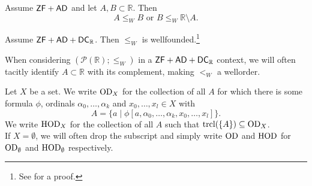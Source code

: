 \documentclass[../main]{subfiles}
\begin{document}
\begin{lemma}
  Assume $\textsf{ZF} + \textsf{AD}$ and let $A, B \subset \mathbb{R}$. Then
  \[
    A \le_{W} B \text{ or } B \le_{W} \mathbb{R} \setminus A.
  \]  
\end{lemma}

\begin{lemma}
  Assume $\textsf{ZF} + \textsf{AD} + \textsf{DC}_{\mathbb{R}}$. Then
  $\leq_{W}$ is wellfounded.\footnote{See \cite{Larson} for a proof.}
\end{lemma}

\begin{remark}
  When considering $(\mathcal{P}(\mathbb{R}); \le_{W})$ in a
  $\textsf{ZF} + \textsf{AD}+\textsf{DC}_{\mathbb R}$ context, we will often tacitly identify
  $A \subset \mathbb{R}$ with its complement, making $<_W$ a wellorder.
\end{remark}


\begin{definition}
  Let $X$ be a set. We write $\operatorname{OD}_{X}$  for the
  collection of all $A$ for which there is some formula $\phi$,
  ordinals $\alpha_{0}, \ldots, \alpha_{k}$ and $x_{0}, \ldots, x_{l}\in X$
  with
  \[
    A = \{ a \mid \phi[a, \alpha_{0}, \ldots, \alpha_{k}, x_{0},
    \ldots, x_{l}] \}.\tag*{$\dashv$}
  \]
  We write $\operatorname{HOD}_{X}$ for the collection of all $A$ such that
  $\operatorname{trcl}(\{A\}) \subseteq \operatorname{OD}_{X}$. \\
  If $X = \emptyset$, we will often drop the subscript and simply
  write $\operatorname{OD}$ and $\operatorname{HOD}$ for $\operatorname{OD}_{\emptyset}$ and $\operatorname{HOD}_{\emptyset}$
  respectively.
\end{definition}

\end{document}
